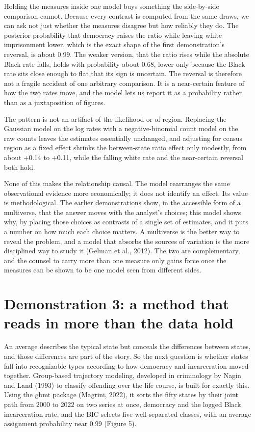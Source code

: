 \documentclass[
  12pt,
]{article}
\begin{document}
Holding the measures inside one model buys something the side-by-side
comparison cannot. Because every contrast is computed from the same
draws, we can ask not just whether the measures disagree but how
reliably they do. The posterior probability that democracy raises the
ratio while leaving white imprisonment lower, which is the exact shape
of the first demonstration's reversal, is about 0.99. The weaker
version, that the ratio rises while the absolute Black rate falls, holds
with probability about 0.68, lower only because the Black rate sits
close enough to flat that its sign is uncertain. The reversal is
therefore not a fragile accident of one arbitrary comparison. It is a
near-certain feature of how the two rates move, and the model lets us
report it as a probability rather than as a juxtaposition of figures.

The pattern is not an artifact of the likelihood or of region. Replacing
the Gaussian model on the log rates with a negative-binomial count model
on the raw counts leaves the estimates essentially unchanged, and
adjusting for census region as a fixed effect shrinks the between-state
ratio effect only modestly, from about +0.14 to +0.11, while the falling
white rate and the near-certain reversal both hold.

None of this makes the relationship causal. The model rearranges the
same observational evidence more economically; it does not identify an
effect. Its value is methodological. The earlier demonstrations show, in
the accessible form of a multiverse, that the answer moves with the
analyst's choices; this model shows why, by placing those choices as
contrasts of a single set of estimates, and it puts a number on how much
each choice matters. A multiverse is the better way to reveal the
problem, and a model that absorbs the sources of variation is the more
disciplined way to study it (Gelman et al., 2012). The two are
complementary, and the counsel to carry more than one measure only gains
force once the measures can be shown to be one model seen from different
sides.

\section{Demonstration 3: a method that reads in more than the data
hold}\label{demonstration-3-a-method-that-reads-in-more-than-the-data-hold}

An average describes the typical state but conceals the differences
between states, and those differences are part of the story. So the next
question is whether states fall into recognizable types according to how
democracy and incarceration moved together. Group-based trajectory
modeling, developed in criminology by Nagin and Land (1993) to classify
offending over the life course, is built for exactly this. Using the
gbmt package (Magrini, 2022), it sorts the fifty states by their joint
path from 2000 to 2022 on two series at once, democracy and the logged
Black incarceration rate, and the BIC selects five well-separated
classes, with an average assignment probability near 0.99 (Figure 5).
\end{document}
